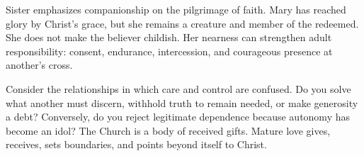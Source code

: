 Sister emphasizes companionship on the pilgrimage of faith. Mary has reached glory by Christ's grace, but she remains a creature and member of the redeemed. She does not make the believer childish. Her nearness can strengthen adult responsibility: consent, endurance, intercession, and courageous presence at another's cross.

Consider the relationships in which care and control are confused. Do you solve what another must discern, withhold truth to remain needed, or make generosity a debt? Conversely, do you reject legitimate dependence because autonomy has become an idol? The Church is a body of received gifts. Mature love gives, receives, sets boundaries, and points beyond itself to Christ.




